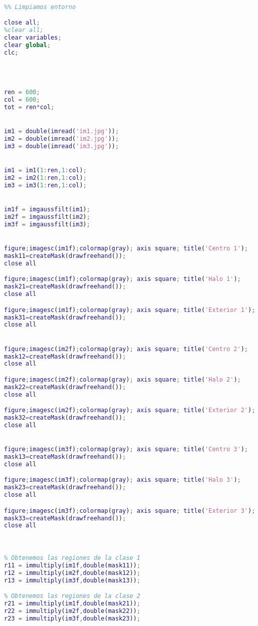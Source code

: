 \documentclass[10pt,journal,compsoc]{IEEEtran}
\begin{document}
\begin{lstlisting}[language=Matlab,basicstyle=\small]

%% Limpiamos entorno

close all;
%clear all;
clear variables;
clear global;
clc;
 



ren = 600;
col = 600;
tot = ren*col;


im1 = double(imread('im1.jpg'));
im2 = double(imread('im2.jpg'));
im3 = double(imread('im3.jpg'));


im1 = im1(1:ren,1:col);
im2 = im2(1:ren,1:col);
im3 = im3(1:ren,1:col);


im1f = imgaussfilt(im1);
im2f = imgaussfilt(im2);
im3f = imgaussfilt(im3);


figure;imagesc(im1f);colormap(gray); axis square; title('Centro 1');
mask11=createMask(drawfreehand());
close all

figure;imagesc(im1f);colormap(gray); axis square; title('Halo 1');
mask21=createMask(drawfreehand());
close all

figure;imagesc(im1f);colormap(gray); axis square; title('Exterior 1');
mask31=createMask(drawfreehand());
close all


figure;imagesc(im2f);colormap(gray); axis square; title('Centro 2');
mask12=createMask(drawfreehand());
close all

figure;imagesc(im2f);colormap(gray); axis square; title('Halo 2');
mask22=createMask(drawfreehand());
close all

figure;imagesc(im2f);colormap(gray); axis square; title('Exterior 2');
mask32=createMask(drawfreehand());
close all


figure;imagesc(im3f);colormap(gray); axis square; title('Centro 3');
mask13=createMask(drawfreehand());
close all

figure;imagesc(im3f);colormap(gray); axis square; title('Halo 3');
mask23=createMask(drawfreehand());
close all

figure;imagesc(im3f);colormap(gray); axis square; title('Exterior 3');
mask33=createMask(drawfreehand());
close all



% Obtenemos las regiones de la clase 1
r11 = immultiply(im1f,double(mask11));
r12 = immultiply(im2f,double(mask12));
r13 = immultiply(im3f,double(mask13));

% Obtenemos las regiones de la clase 2
r21 = immultiply(im1f,double(mask21));
r22 = immultiply(im2f,double(mask22));
r23 = immultiply(im3f,double(mask23));


\end{lstlisting}
\end{document}
